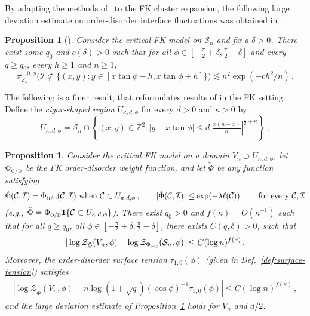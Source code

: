 \documentclass[reqno,11pt]{amsart}
\numberwithin{equation}{section}
\newcommand{\one}{\mathbf{1}}
\newtheorem{proposition}[theorem]{Proposition}
\theoremstyle{definition}{
\newtheorem{example}[theorem]{Example}
\newtheorem{definition}[theorem]{Definition}
\newtheorem*{definition*}{Definition}
\newtheorem{problem}[theorem]{Problem}
\newtheorem{question}[theorem]{Question}
\newtheorem{remark}[theorem]{Remark}
}
\newcommand{\cC}{\ensuremath{\mathcal C}}
\begin{document}
By adapting the methods of~\cite{DKS} to the FK cluster expansion, the following large deviation estimate on order-disorder interface fluctuations was obtained in~\cite{MMRS91}.

\begin{proposition}[{\cite[Proposition 5]{MMRS91}}] \label{prop:fk-415} Consider the critical FK model on $\mathcal S_n$ and fix a $\delta>0$. There exist some $q_0$ and $c(\delta)>0$ such that for all $\phi\in [-\frac \pi 2+\delta ,\frac \pi 2-\delta ]$ and every $q\geq q_0$,  every $h\geq 1$ and $n\geq 1$,
\[\pi_{\mathcal S_n}^{1,0,\phi}\big(\mathcal I\not\subset \{(x,y):y\in [  x \tan \phi -h, x\tan \phi + h] \}\big)\lesssim n^2 \exp(-ch^2/n)\,.
\]
\end{proposition}

The following is a finer result, that reformulates results of \cite{DKS} in the FK setting.
Define the \emph{cigar-shaped region} $U_{\kappa,d,\phi}$ for every $d>0$ and $\kappa>0$ by
\begin{equation}\label{eq:cigar-shaped-region}
U_{\kappa,d,\phi}=\mathcal S_n\cap \left\{ (x,y)\in \mathbb Z^2:|y-x\tan \phi| \leq d\left|\tfrac {x(n-x)}n\right|^{\frac 12+\kappa}\right\}\,,
\end{equation}

\begin{proposition} \label{prop:fk-416} Consider the critical FK model on a domain $V_n\supset U_{\kappa,d,\phi}$, let $\Phi_{\textsc{o/d}}$ be the FK order-disorder weight function,  and let $\tilde \Phi$ be any function satisfying
\[\tilde \Phi(\mathcal C,\mathcal I)=\Phi_{\textsc{o/d}}(\mathcal C,\mathcal I) \mbox{ when } \mathcal C\subset U_{\kappa,d,\phi}\,, \qquad | \tilde \Phi(\mathcal C,\mathcal I)|\leq \exp(-\lambda \ell(\mathcal C)) \qquad \mbox{ for every $\mathcal C, \mathcal I$}
\] (e.g., $\tilde \Phi=\Phi_{\textsc{o/d}} \one\{\cC\subset U_{\kappa,d,\phi}\}$). There exist  $q_0>0$ and $f(\kappa)=O(\kappa^{-1})$ such that for all $q\geq q_0$, all $\phi \in [-\frac{\pi}2 +\delta, \frac{\pi}{2}-\delta]$, there exists $C(q,\delta)>0$, such that
\begin{align}\label{eq:domain-comparison}
|\log {\mathcal Z}_{\tilde \Phi}(V_n,\phi)-\log \mathcal Z_{\Phi_{\textsc{o/d}}} (\mathcal S_n,\phi)|\leq C(\log n)^{f(\kappa)}\,.
\end{align}
Moreover, the order-disorder surface tension $\tau_{1,0}(\phi)$ (given in Def.~\ref{def:surface-tension}) satisfies
\begin{align}\label{eq:surface-tension}
|\log { {\mathcal Z}}_{\tilde \Phi} (V_n,\phi)-n\log (1+\sqrt q) (\cos\phi)^{-1}\tau_{1,0}(\phi)|\leq  C(\log n)^{f(\kappa)}\,,
\end{align}
and the large deviation estimate of Proposition~\ref{prop:fk-415} holds for $V_n$ and $d/2$.
\end{proposition}
\end{document}
